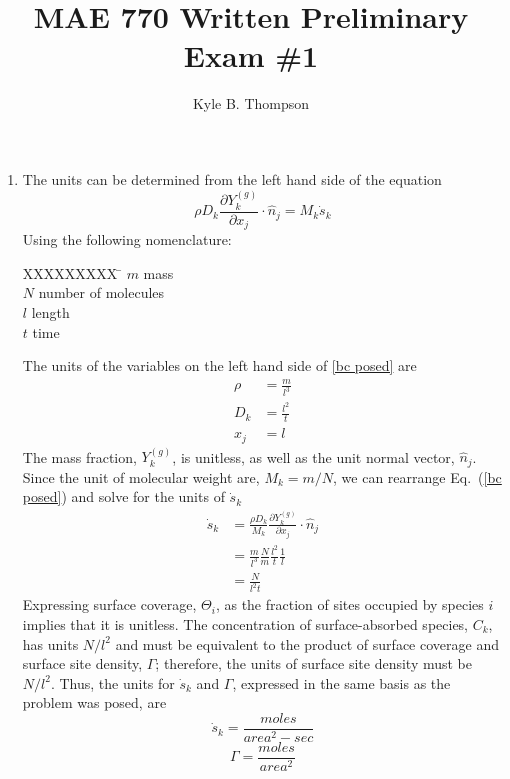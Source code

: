 \documentclass[a4paper]{report}
\title{MAE 770 Written Preliminary Exam \#1}
\author{ Kyle B. Thompson }
\newcommand{\eref}[1]{Eq.~(\ref{#1})}
\newcommand{\sk}{\dot{s}_k}
\begin{document}
\maketitle
\begin{enumerate}
  \item The units can be determined from the left hand side of the equation
    \begin{equation}
      \rho D_k \frac{\partial Y_k^{(g)}}{\partial x_j} \cdot \hat{n}_j = M_k \sk
      \label{bc posed}
    \end{equation}
  Using the following nomenclature:
  \begin{tabbing}
    XXXXXXXXX \= \kill%
    $m$ \> mass \\
    $N$ \> number of molecules \\
    $l$ \> length \\
    $t$ \> time
  \end{tabbing}
  The units of the variables on the left hand side of \ref{bc posed} are
  \begin{align*}
    \rho &= \frac{m}{l^3} \\
    D_k &= \frac{l^2}{t} \\
    x_j &= l
  \end{align*}
  The mass fraction, $Y_k^{(g)}$, is unitless, as well as the unit normal vector,
  $\hat{n}_j$. Since the unit of molecular weight are, $M_k = m/N$, we can
  rearrange \eref{bc posed} and solve for the units of $\sk$
  \begin{equation}
    \label{units sdot}
    \begin{aligned}
      \sk &= \frac{\rho D_k}{M_k}\frac{\partial Y_k^{(g)}}{\partial x_j}\cdot \hat{n}_j \\
      &= \frac{m}{l^3} \frac{N}{m} \frac{l^2}{t}\frac{1}{l} \\
      &= \frac{N}{l^2 t}
    \end{aligned}
  \end{equation}
  Expressing surface coverage, $\Theta_i$, as the fraction of sites occupied by
  species $i$ implies that it is unitless.  The concentration of
  surface-absorbed species, $C_k$, has units $N/l^2$ and must be equivalent to
  the product of surface coverage and surface site density, $\Gamma$; therefore,
  the units of surface site density must be $N/l^2$.  Thus, the units for $\sk$
  and $\Gamma$, expressed in the same basis as the problem was posed, are
  \[
    \boxed{\sk = \frac{moles}{area^2-sec}}
  \]
  \[
    \boxed{\Gamma = \frac{moles}{area^2}}
  \]


\end{enumerate}
\end{document}
